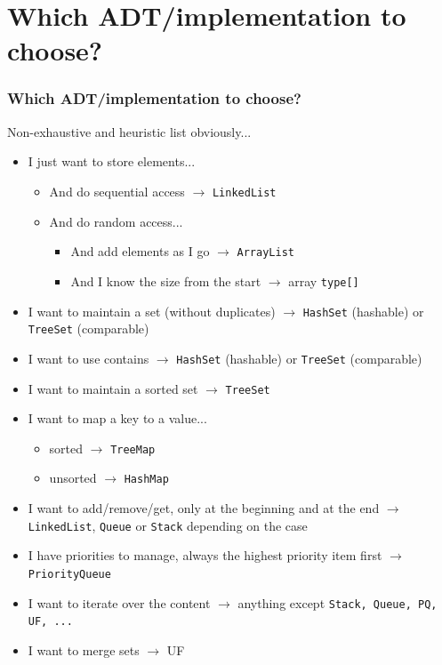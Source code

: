 \documentclass[8pt,aspectratio=169]{beamer}
\begin{document}
\section{Which ADT/implementation to choose?}

\begin{frame}
\frametitle{Which ADT/implementation to choose?}
\color{red} Non-exhaustive and heuristic list obviously...
\begin{itemize}
	\item I just want to store elements...
		\begin{itemize}
			\item And do sequential access $\rightarrow$ \texttt{LinkedList}
			\item And do random access...
				\begin{itemize}
					\item And add elements as I go $\rightarrow$ \texttt{ArrayList}
					\item And I know the size from the start $\rightarrow$ array \texttt{type[]}
				\end{itemize}
		\end{itemize}
	\item I want to maintain a set (without duplicates) $\rightarrow$ \texttt{HashSet} (hashable) or \texttt{TreeSet} (comparable)
	\item I want to use contains $\rightarrow$ \texttt{HashSet} (hashable) or \texttt{TreeSet} (comparable)
	\item I want to maintain a sorted set $\rightarrow$ \texttt{TreeSet}
	\item I want to map a key to a value...
		\begin{itemize}
			\item sorted $\rightarrow$ \texttt{TreeMap}
			\item unsorted $\rightarrow$ \texttt{HashMap}
		\end{itemize}
	\item I want to add/remove/get, only at the beginning and at the end $\rightarrow$ \texttt{LinkedList}, \texttt{Queue} or \texttt{Stack} depending on the case
	\item I have priorities to manage, always the highest priority item first $\rightarrow$ \texttt{PriorityQueue}
	\item I want to iterate over the content $\rightarrow$ anything except \texttt{Stack, Queue, PQ, UF, ...}
	\item I want to merge sets $\rightarrow$ UF
\end{itemize}
\end{frame}
\end{document}
